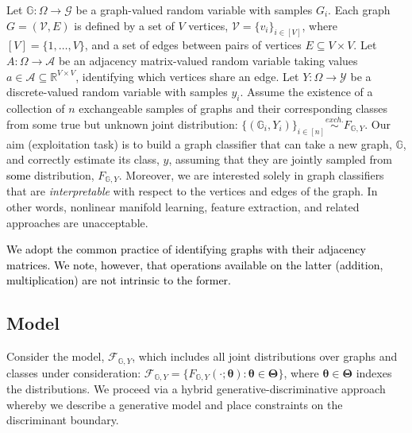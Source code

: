 \documentclass[10pt,journal,cspaper,compsoc]{IEEEtran}
\providecommand{\tk}[1]{\textcolor{black}{#1}}
\providecommand{\ve}[1]{\boldsymbol{#1}}
\newcommand{\GG}{\mathbb{G}}
\newcommand{\bth}{\ve{\theta}}
\newcommand{\bTh}{\ve{\Theta}}
\providecommand{\mc}[1]{\mathcal{#1}}
\newcommand{\Real}{\mathbb{R}}
\newcommand{\comment}[1]{}
\begin{document}
Let $\GG: \Omega \to  \mc{G}$ be a graph-valued random variable with samples $G_i$.  Each graph $G=(\mc{V},E)$ is defined by a set of $V$ vertices, $\mc{V}=\{v_i\}_{i \in [V]}$, where $[V]=\{1,\ldots, V\}$, and a set of  edges between pairs of vertices $E \subseteq V \times V$. Let $A: \Omega \to  \mc{A}$ be an adjacency matrix-valued random variable taking values $a \in \mc{A} \subseteq \Real^{V \times V}$, identifying which vertices share an edge. Let $Y:\Omega \to  \mc{Y}$ be a discrete-valued random variable with samples $y_i$.  Assume the existence of a collection of $n$ exchangeable samples of graphs and their corresponding classes from some true but unknown joint distribution: $\{(\GG_i,Y_i)\}_{i \in [n]} \overset{exch.}{\sim} F_{\GG,Y}$. Our aim (exploitation task) is to build a graph classifier that can take a new graph, $\GG$, and correctly estimate its class, $y$, assuming that they are jointly sampled from \comment{the same} \tk{some} distribution, $F_{\GG,Y}$.  Moreover, we are interested solely in graph classifiers that are \emph{interpretable} with respect to the vertices and edges of the graph. In other words, nonlinear manifold learning, feature extraction, and related approaches are unacceptable.  

\tk{We adopt the common practice of identifying graphs with their adjacency matrices.  We note, however, that operations available on the latter (addition, multiplication) are not intrinsic to the former.}

\subsection{Model} %
\label{sub:model}

\comment{A model defines the set of distributions under consideration.  In the graph classification domain, we} Consider the model, $\mc{F}_{\GG,Y}$, which includes all joint distributions over graphs and classes under consideration: $\mc{F}_{\GG,Y}=\{F_{\GG, Y}(\cdot; \bth) : \bth \in \bTh\}$, where $\bth \in \bTh$ indexes the distributions.  \comment{Two standard approaches for tackling a classification problem are (i) the \emph{generative} approach and (ii) the \emph{discriminative} approach.  In a generative strategy, one decomposes the joint distribution into a product of a likelihood term and a prior term:  $F_{\GG,Y}=F_{\GG | Y}F_Y$.  In a discriminative strategy, one decomposes the joint distribution into a posterior term and a marginal term: $F_{\GG,Y}=F_{Y | \GG}F_{\GG}$.}  We proceed via a hybrid generative-discriminative approach \tk{\cite{Lasserre2006}} whereby we describe a generative model and place constraints on the discriminant boundary.
\end{document}
